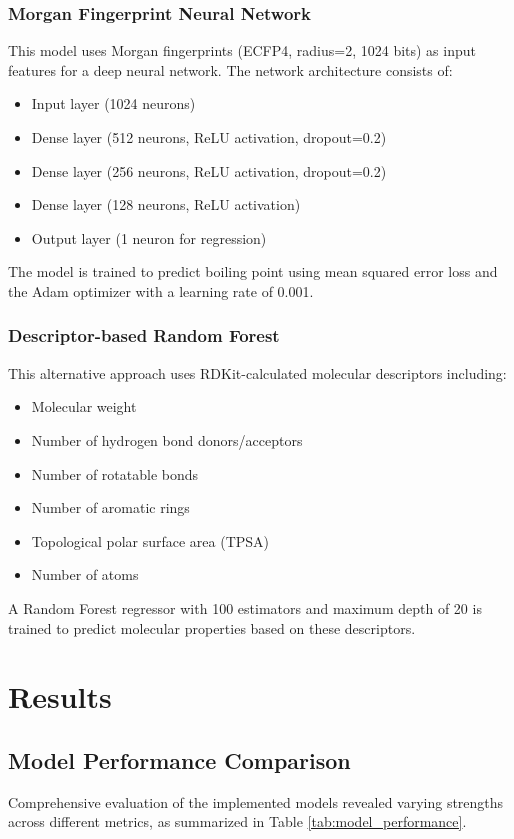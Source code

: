 \documentclass[conference]{IEEEtran}
\begin{document}
\subsubsection{Morgan Fingerprint Neural Network}
This model uses Morgan fingerprints (ECFP4, radius=2, 1024 bits) as input features for a deep neural network. The network architecture consists of:
\begin{itemize}
    \item Input layer (1024 neurons)
    \item Dense layer (512 neurons, ReLU activation, dropout=0.2)
    \item Dense layer (256 neurons, ReLU activation, dropout=0.2)
    \item Dense layer (128 neurons, ReLU activation)
    \item Output layer (1 neuron for regression)
\end{itemize}

The model is trained to predict boiling point using mean squared error loss and the Adam optimizer with a learning rate of 0.001.

\subsubsection{Descriptor-based Random Forest}
This alternative approach uses RDKit-calculated molecular descriptors including:
\begin{itemize}
    \item Molecular weight
    \item Number of hydrogen bond donors/acceptors
    \item Number of rotatable bonds
    \item Number of aromatic rings
    \item Topological polar surface area (TPSA)
    \item Number of atoms
\end{itemize}

A Random Forest regressor with 100 estimators and maximum depth of 20 is trained to predict molecular properties based on these descriptors.

\section{Results}

\subsection{Model Performance Comparison}
Comprehensive evaluation of the implemented models revealed varying strengths across different metrics, as summarized in Table \ref{tab:model_performance}.
\end{document}
